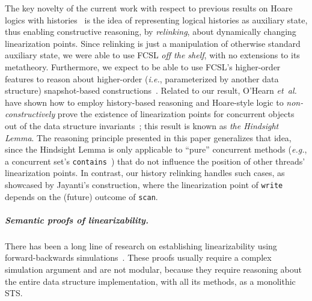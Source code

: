 \documentclass[a4paper,UKenglish]{lipics-v2016}
\newcommand{\ie}{\emph{i.e.}\xspace}
\newcommand{\eg}{\emph{e.g.}\xspace}
\newcommand{\etal}{\emph{et~al.}\xspace}
\theoremstyle{definition}
\begin{document}

The key novelty of the current work with respect to previous results
on Hoare logics with histories~\cite{FuLFSZ+CONCUR10, LiangF+PLDI13,
  GotsmanRY+ESOP13, BellAW+SAS10, SergeyNB+ESOP15, HemedRV+DISC15} is
the idea of representing logical histories as auxiliary state, thus
enabling constructive reasoning, by \emph{relinking}, about
dynamically changing linearization points.
%
Since relinking is just a manipulation of otherwise standard auxiliary
state, we were able to use FCSL \emph{off the shelf}, with no
extensions to its metatheory. Furthermore, we expect to be able to use
FCSL's higher-order features to reason about higher-order (\ie,
parameterized by another data structure) snapshot-based
constructions~\cite{PetrankT+DISC13}.
%
Related to our result, O'Hearn \etal have shown how to employ
history-based reasoning and Hoare-style logic to
\emph{non-constructively} prove the existence of linearization points
for concurrent objects out of the data structure
invariants~\cite{OHearnRVYY+PODC10}; this result is known as \emph{the
  Hindsight Lemma}. The reasoning principle presented in this paper
generalizes that idea, since the Hindsight Lemma is only applicable to
``pure'' concurrent methods (\eg, a concurrent set's
\texttt{contains}~\cite{HellerHLMSS+OPODIS05}) that do not influence
the position of other threads' linearization points. In contrast, our
history relinking handles such cases, as showcased by Jayanti's
construction, where the linearization point of \texttt{write} depends
on the (future) outcome of \texttt{scan}.


\subparagraph*{Semantic proofs of linearizability.}
\label{sec:semant-proofs-line}

There has been a long line of research on establishing linearizability
using forward-backwards
simulations~\cite{SchellhornWD+CAV12,ColvinGLM06,ColvinDG05}. These
proofs usually require a complex simulation argument and are not
modular, because they require reasoning about the entire data
structure implementation, with all its methods, as a monolithic STS.
\end{document}
